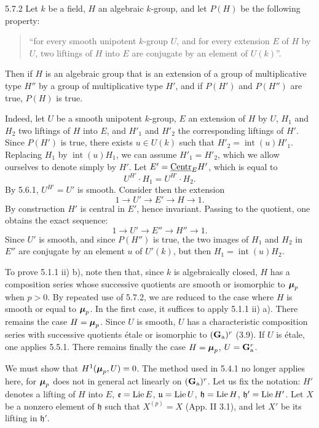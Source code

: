 \begin{lemma}{5.7.2}\label{XVII.5.7.2}
Let $k$ be a field, $H$ an algebraic $k$-group, and let $P(H)$ be the following property:
\begin{quote}
``for every smooth unipotent $k$-group $U$, and for every extension $E$ of $H$ by $U$, two liftings of $H$ into $E$ are conjugate by an element of $U(k)$''.
\end{quote}
Then if $H$ is an algebraic group that is an extension of a group of multiplicative type $H''$ by a group of multiplicative type $H'$, and if $P(H')$ and $P(H'')$ are true, $P(H)$ is true.
\end{lemma}
Indeed, let $U$ be a smooth unipotent $k$-group, $E$ an extension of $H$ by $U$, $H_1$ and $H_2$ two liftings of $H$ into $E$, and $H'_1$ and $H'_2$ the corresponding liftings of $H'$. Since $P(H')$ is true, there exists $u\in U(k)$ such that $H'_2=\operatorname{int}(u)H'_1$. Replacing $H_1$ by $\operatorname{int}(u)H_1$, we can assume $H'_1=H'_2$, which we allow ourselves to denote simply by $H'$. Let $E'=\underline{\mathrm{Centr}}_E H'$, which is equal to
\[
 U^{H'}\cdot H_1=U^{H'}\cdot H_2.
\]
By 5.6.1, $U^{H'}=U'$ is smooth. Consider then the extension
\[
 1\to U'\to E'\to H\to1.
\]
By construction $H'$ is central in $E'$, hence invariant. Passing to the quotient, one obtains the exact sequence:
\[
 1\to U'\to E''\to H''\to1.
\]
Since $U'$ is smooth, and since $P(H'')$ is true, the two images of $H_1$ and $H_2$ in $E''$ are conjugate by an element $u$ of $U'(k)$, but then $H_1=\operatorname{int}(u)H_2$.

To prove 5.1.1 ii) b), note then that, since $k$ is algebraically closed, $H$ has a composition series whose successive quotients are smooth or isomorphic to $\boldsymbol{\mu}_p$ when $p>0$. By repeated use of 5.7.2, we are reduced to the case where $H$ is smooth or equal to $\boldsymbol{\mu}_p$. In the first case, it suffices to apply 5.1.1 ii) a). There remains the case $H=\boldsymbol{\mu}_p$. Since $U$ is smooth, $U$ has a characteristic composition series with successive quotients étale or isomorphic to $(\mathbf{G}_{\mathrm{a}})^r$ (3.9). If $U$ is étale, one applies 5.5.1. There remains finally the case $H=\boldsymbol{\mu}_p$, $U=\mathbf{G}_{\mathrm{a}}^r$.

We must show that $H^1(\boldsymbol{\mu}_p,U)=0$. The method used in 5.4.1 no longer applies here, for $\boldsymbol{\mu}_p$ does not in general act linearly on $(\mathbf{G}_{\mathrm{a}})^r$. Let us fix the notation: $H'$ denotes a lifting of $H$ into $E$, $\mathfrak e=\operatorname{Lie} E$, $\mathfrak u=\operatorname{Lie} U$, $\mathfrak h=\operatorname{Lie} H$, $\mathfrak h'=\operatorname{Lie} H'$. Let $X$ be a nonzero element of $\mathfrak h$ such that $X^{(p)}=X$ (App. II 3.1), and let $X'$ be its lifting in $\mathfrak h'$.

